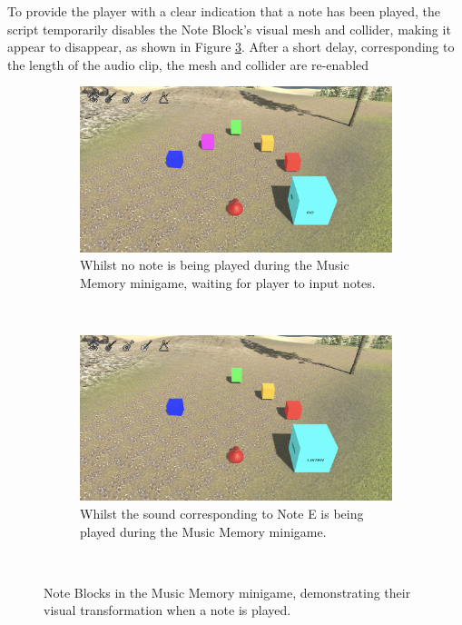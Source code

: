\documentclass{l4proj}
\begin{document}
To provide the player with a clear indication that a note has been played, the script temporarily disables the Note Block's visual mesh and collider, making it appear to disappear, as shown in Figure \ref{fig:mem_game}. After a short delay, corresponding to the length of the audio clip, the mesh and collider are re-enabled

\begin{figure}[h]
    \centering
    \begin{subfigure}[b]{0.45\textwidth}
        \includegraphics[width=\textwidth]{dissertation/images/Memory_Game_HarmonyScape.png}
        \caption{Whilst no note is being played during the Music Memory minigame, waiting for player to input notes.}
        \label{fig:mem_game_unplayed}
    \end{subfigure}
    ~ 
    \begin{subfigure}[b]{0.45\textwidth}
        \includegraphics[width=\textwidth]{dissertation/images/Memory_Game_During.png}
        \caption{Whilst the sound corresponding to Note E is being played during the Music Memory minigame.}
        \label{fig:mem_game_played}
    \end{subfigure}
    ~     
    \caption{Note Blocks in the Music Memory minigame, demonstrating their visual transformation when a note is played.
    }
    \label{fig:mem_game} 
\end{figure}
\end{document}
